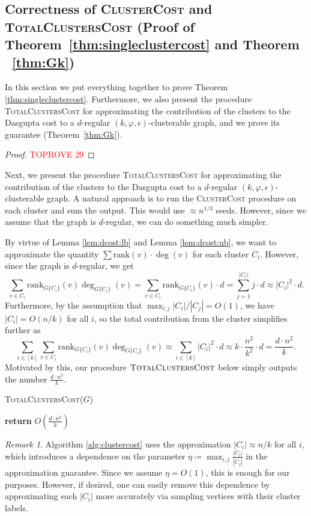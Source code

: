 \documentclass[letterpaper,11pt]{article}
\newcommand{\rank}{\mathrm{rank}}
\theoremstyle{plain}
\theoremstyle{definition}
\theoremstyle{remark}
\newtheorem{remark}[theorem]{Remark}
\newcommand{\return}{\textbf{return }}
\begin{document}
\subsection{Correctness of \textsc{ClusterCost} and \textsc{TotalClustersCost} (Proof of Theorem~\ref{thm:singleclustercost} and Theorem ~\ref{thm:Gk})} \label{sec:clustercost}
In this section we put everything together to prove Theorem \ref{thm:singleclustercost}. Furthermore, we also present the 
procedure \textsc{TotalClustersCost} for approximating the contribution of the clusters to the Dasgupta cost to a $d$-regular $(k, \varphi, \epsilon)$-clusterable graph, and we prove its guarantee (Theorem~\ref{thm:Gk}).  
\singleclustercost*

\begin{proof}\textcolor{red}{TOPROVE 29}\end{proof}

Next, we present the procedure \textsc{TotalClustersCost} for approximating the contribution of the clusters to the Dasgupta cost to a $d$-regular $(k, \varphi, \epsilon)$-clusterable graph. A natural approach is to run the \textsc{ClusterCost} procedure on each cluster and sum the output. This would use $\approx n^{1/3}$ seeds. However, since we assume that the graph is $d$-regular, we can do something much simpler. 

By virtue of Lemma \ref{lem:dcost:lb} and Lemma \ref{lem:dcost:ub}, we want to approximate the quantity $\sum \rank(v) \cdot \deg(v)$ for each cluster $C_i$. However, since the graph is $d$-regular, we get 
$$\sum_{v \in C_i} \rank_{G\{C_i\}}(v) \deg_{G\{C_i\}}(v) = \sum_{v \in C_i}\rank_{G\{C_i\}}(v) \cdot d  = \sum_{j =1}^{|C_i|} j \cdot d \approx |C_i|^2 \cdot d.$$
Furthermore, by the assumption that $\max_{i,j}|C_i|/|C_j| =  O(1)$, we have $|C_i| = O(n/k)$ for all $i$, so the total contribution from the cluster simplifies further as
$$\sum_{i \in [k]}\sum_{v \in C_i} \rank_{G\{C_i\}}(v) \deg_{G\{C_i\}}(v) \approx \sum_{i \in [k]} |C_i|^2 \cdot d   \approx k \cdot \frac{n^2}{k^2} \cdot d = \frac{d \cdot n^2}{k}.$$
Motivated by this, our procedure $\textsc{TotalClustersCost}$ below simply outputs the number $\frac{d \cdot n^2}{k}$. 

\begin{algorithm}[H]
	\caption{\textsc{TotalClustersCost}($G$)}
	\label{alg:clustercost}
	\begin{algorithmic}[1]
		\STATE\return $O \left( \frac{d \cdot n^2}{k}\right)$
	\end{algorithmic}
\end{algorithm}
\begin{remark} Algorithm \ref{alg:clustercost} uses the approximation $|C_i| \approx n/k$ for all $i$, which introduces a dependence on the parameter $\eta \coloneqq \max_{i,j} \frac{|C_i|}{|C_j|}$ in the approximation guarantee. Since we assume $\eta = O(1)$, this is enough for our purposes. However, if desired, one can easily remove this dependence by approximating each $|C_i|$ more accurately via sampling vertices with their cluster labels.
\end{remark}
\end{document}
